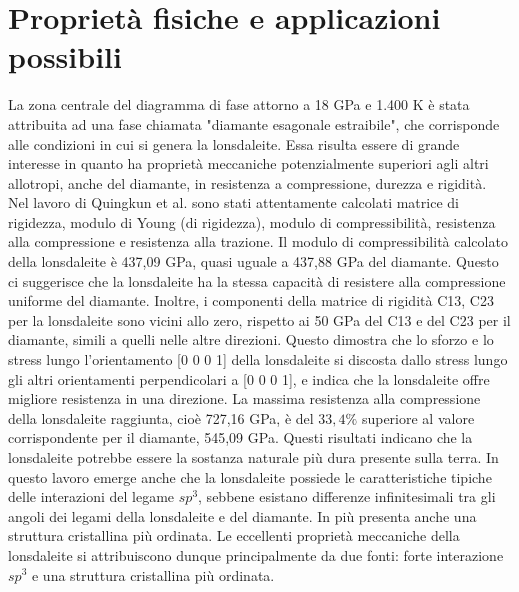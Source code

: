 \documentclass[a4paper,titlepage]{book}
\begin{document}
\section{Proprietà fisiche e applicazioni possibili}
La zona centrale del diagramma di fase attorno a 18 GPa e 1.400 K  è stata attribuita ad una fase chiamata "diamante esagonale estraibile", che corrisponde alle condizioni in cui si genera la lonsdaleite. Essa risulta essere di grande interesse in quanto ha proprietà meccaniche potenzialmente superiori agli altri allotropi, anche del diamante, in resistenza a compressione, durezza e rigidità.\\
Nel lavoro di Quingkun et al. \cite{qing} sono stati attentamente calcolati matrice di rigidezza, modulo di Young (di rigidezza), modulo di compressibilità, resistenza alla compressione e resistenza alla trazione. 
Il modulo di compressibilità calcolato della lonsdaleite è 437,09 GPa, quasi uguale a 437,88 GPa del diamante. Questo ci suggerisce che la lonsdaleite ha la stessa capacità di resistere alla compressione uniforme del diamante. Inoltre, i componenti della matrice di rigidità C13, C23 per la lonsdaleite sono vicini allo zero, rispetto ai 50 GPa del C13 e del C23 per il diamante, simili a quelli nelle altre direzioni. Questo dimostra che lo sforzo e lo stress lungo l'orientamento [0 0 0 1] della lonsdaleite si discosta dallo stress lungo gli altri orientamenti perpendicolari a [0 0 0 1], e indica che la lonsdaleite offre migliore resistenza in una direzione.
La massima resistenza alla compressione della lonsdaleite raggiunta, cioè 727,16 GPa, è del $33,4\%$ superiore al valore corrispondente per il diamante, 545,09 GPa. Questi risultati indicano che la lonsdaleite potrebbe essere la sostanza naturale più dura presente sulla terra. 
In questo lavoro emerge anche che la lonsdaleite possiede le caratteristiche tipiche delle interazioni del legame $sp^3$, sebbene esistano differenze infinitesimali tra gli angoli dei legami della lonsdaleite e del diamante. In più presenta anche una struttura cristallina più ordinata. Le eccellenti proprietà meccaniche della lonsdaleite si attribuiscono dunque principalmente da due fonti: forte interazione $sp^3$ e una struttura cristallina più ordinata.\\
\end{document}

